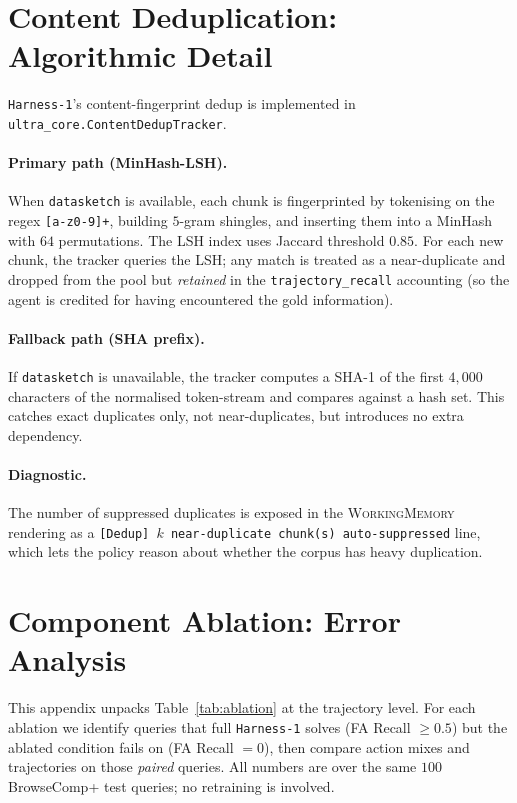\documentclass{article}
\newcommand{\sys}{\texttt{Harness-1}\xspace}
\newcommand{\wm}{\textsc{WorkingMemory}\xspace}
\begin{document}
\section{Content Deduplication: Algorithmic Detail}
\label{app:dedup}

\sys's content-fingerprint dedup is implemented in
\texttt{ultra\_core.ContentDedupTracker}.

\paragraph{Primary path (MinHash-LSH).} When \texttt{datasketch}
is available, each chunk is fingerprinted by tokenising on the
regex \texttt{[a-z0-9]+}, building $5$-gram shingles, and
inserting them into a MinHash with $64$ permutations. The LSH
index uses Jaccard threshold $0.85$. For each new chunk, the
tracker queries the LSH; any match is treated as a near-duplicate
and dropped from the pool but \emph{retained} in the
\texttt{trajectory\_recall} accounting (so the agent is credited
for having encountered the gold information).

\paragraph{Fallback path (SHA prefix).} If \texttt{datasketch}
is unavailable, the tracker computes a SHA-1 of the first
$4{,}000$ characters of the normalised token-stream and compares
against a hash set. This catches exact duplicates only, not
near-duplicates, but introduces no extra dependency.

\paragraph{Diagnostic.} The number of suppressed duplicates is
exposed in the \wm rendering as a \texttt{[Dedup] $k$
near-duplicate chunk(s) auto-suppressed} line, which lets the
policy reason about whether the corpus has heavy duplication.

\section{Component Ablation: Error Analysis}
\label{app:ablation-error}

This appendix unpacks Table~\ref{tab:ablation} at the trajectory
level. For each ablation we identify queries that full \sys
solves (FA Recall ${\geq}0.5$) but the ablated condition fails
on (FA Recall ${=}0$), then compare action mixes and trajectories
on those \emph{paired} queries. All numbers are over the same
$100$ BrowseComp+ test queries; no retraining is involved.
\end{document}
